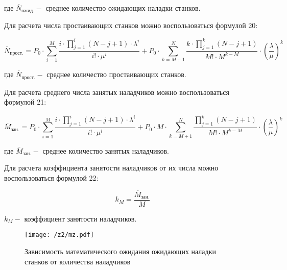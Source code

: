 где  \( \overline{N}_{ожид.}-  \) среднее количество ожидающих наладки станков.\par

Для расчета числа простаивающих станков можно воспользоваться формулой 20:\par

\begin{equation}
    \overline{N}_{прост.}=P_{0} \cdot  \sum _{i=1}^{M}\frac{i \cdot  \prod_{j=1}^{i} \left( N-j+1 \right)  \cdot  \lambda ^{i}}{i! \cdot  \mu ^{i}} + P_{0} \cdot  \sum _{k=M+1}^{N}\frac{k \cdot  \prod_{j=1}^{k} \left( N-j+1 \right) }{M! \cdot M^{k-M}} \cdot  \left( \frac{ \lambda }{ \mu } \right) ^{k}
\end{equation} \par

где  \( \overline{N}_{прост.}-  \) среднее количество простаивающих станков.\par

Для расчета среднего числа занятых наладчиков можно воспользоваться формулой 21:\par

\begin{equation}
    \overline{M}_{зан.}=P_{0} \cdot  \sum _{i=1}^{M}\frac{i \cdot  \prod_{j=1}^{i} \left( N-j+1 \right)  \cdot  \lambda ^{i}}{i! \cdot  \mu ^{i}} + P_{0} \cdot M \cdot  \sum _{k=M+1}^{N}\frac{ \prod_{j=1}^{k} \left( N-j+1 \right) }{M! \cdot M^{k-M}} \cdot  \left( \frac{ \lambda }{ \mu } \right) ^{k}
\end{equation} \par

где  \( \overline{M}_{зан.}-  \) среднее количество занятых наладчиков.\par

Для расчета коэффициента занятости наладчиков от их числа можно воспользоваться формулой 22:\par

 \begin{equation}
    k_{M}=\frac{\overline{M}_{зан.}}{M} 
\end{equation} \par

 \( k_{M}-  \) коэффициент занятости наладчиков.\par


\begin{figure}[H]
	\begin{center}
        \texttt{[image: /z2/mz.pdf]}
        \caption{Зависимость математического ожидания ожидающих наладки станков от количества наладчиков}
	\end{center}
\end{figure}

